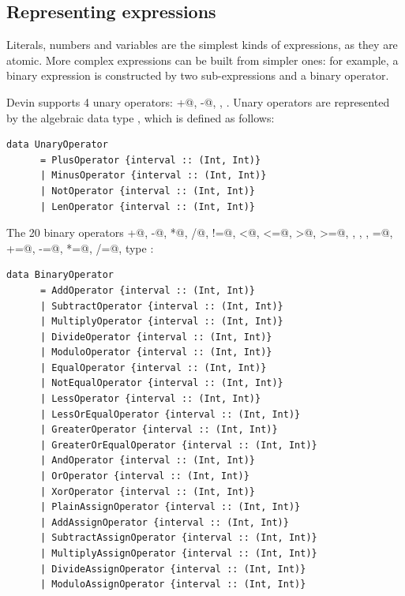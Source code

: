 \documentclass[UdineBachThesis,american,11pt]{PhdThesis}
\begin{document}
  \subsection{Representing expressions}

  Literals, numbers and variables are the simplest kinds of expressions, as they
  are atomic. More complex expressions can be built from simpler ones: for
  example, a binary expression is constructed by two sub-expressions and a
  binary operator.

  Devin supports 4 unary operators: \lstinline@+@, \lstinline@-@,
  \lstinline@not@, \lstinline@len@. Unary operators are represented by the
  algebraic data type \lstinline@UnaryOperator@, which is defined as follows:

  \begin{lstlisting}[gobble=4,basicstyle=\ttfamily\small]
    data UnaryOperator
      = PlusOperator {interval :: (Int, Int)}
      | MinusOperator {interval :: (Int, Int)}
      | NotOperator {interval :: (Int, Int)}
      | LenOperator {interval :: (Int, Int)}
  \end{lstlisting}

  The 20 binary operators \lstinline@+@, \lstinline@-@, \lstinline@*@,
  \lstinline@/@, \lstinline@%@, \lstinline@==@,
  \lstinline@!=@, \lstinline@<@, \lstinline@<=@, \lstinline@>@, \lstinline@>=@,
  \lstinline@and@, \lstinline@or@, \lstinline@xor@, \lstinline@=@,
  \lstinline@+=@, \lstinline@-=@, \lstinline@*=@, \lstinline@/=@,
  \lstinline@%=@ are represented by the
  type \lstinline@BinaryOperator@:

  \begin{lstlisting}[gobble=4,basicstyle=\ttfamily\small]
    data BinaryOperator
      = AddOperator {interval :: (Int, Int)}
      | SubtractOperator {interval :: (Int, Int)}
      | MultiplyOperator {interval :: (Int, Int)}
      | DivideOperator {interval :: (Int, Int)}
      | ModuloOperator {interval :: (Int, Int)}
      | EqualOperator {interval :: (Int, Int)}
      | NotEqualOperator {interval :: (Int, Int)}
      | LessOperator {interval :: (Int, Int)}
      | LessOrEqualOperator {interval :: (Int, Int)}
      | GreaterOperator {interval :: (Int, Int)}
      | GreaterOrEqualOperator {interval :: (Int, Int)}
      | AndOperator {interval :: (Int, Int)}
      | OrOperator {interval :: (Int, Int)}
      | XorOperator {interval :: (Int, Int)}
      | PlainAssignOperator {interval :: (Int, Int)}
      | AddAssignOperator {interval :: (Int, Int)}
      | SubtractAssignOperator {interval :: (Int, Int)}
      | MultiplyAssignOperator {interval :: (Int, Int)}
      | DivideAssignOperator {interval :: (Int, Int)}
      | ModuloAssignOperator {interval :: (Int, Int)}
  \end{lstlisting}
\end{document}
